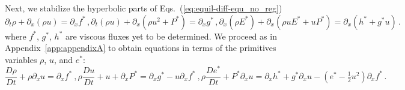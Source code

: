 \documentclass[review]{elsarticle}
\newcommand{\eqts}[1]{Eqs.~(\ref{#1})}                     %
\newcommand{\app}[1]{Appendix~\ref{#1}}                     %
\newcommand{\matder}[1]{\frac{D #1}{Dt}}
\begin{document}
\begin{appendices}
Next, we stabilize the hyperbolic parts of \eqts{eq:equil-diff-equ_no_reg}
%
\begin{subequations}
\label{eq:equil-diff-equ_with_reg}
%
\begin{equation}
\partial_t \rho + \partial_x \left( \rho u \right) = \partial_x f^* \, ,
\end{equation}
%
\begin{equation}
\partial_t \left( \rho u \right) + \partial_x \left( \rho u^2 + P^* \right) = \partial_x g^* \, , 
\end{equation}
%
\begin{equation}
\partial_x \left( \rho E^* \right) + \partial_x \left( \rho u E^* + u P^* \right) =  \partial_x \left( h^* + g^* u \right) \, . 
\end{equation}
%
\end{subequations}
%
where $f^*$, $g^*$, $h^*$ are viscous fluxes yet to be determined. We proceed as in \app{app:appendixA} to obtain equations in terms of the primitives variables $\rho$, $u$, and $e^*$:
%
\begin{subequations}
\label{eq:equil-diff-equ_with_reg_prim}
%
\begin{equation} \label{eq:equil-diff-equ_with_reg_prim_rho}
\matder \rho + \rho \partial_x  u  = \partial_x f^* \ ,
\end{equation}
%
\begin{equation}
\rho \matder u + u  + \partial_x  P^*  = \partial_x g^* - u \partial_x f^* \ , 
\end{equation}
%
\begin{equation} \label{eq:equil-diff-equ_with_reg_prim_e}
\rho \matder {e^*}  +  P^* \partial_x u  =  \partial_x h^* + g^* \partial_x u - \left( e^* - \tfrac 1 2 u^2 \right) \partial_x  f^*\, . 
\end{equation}
%
\end{subequations}


\end{appendices}
\end{document}
